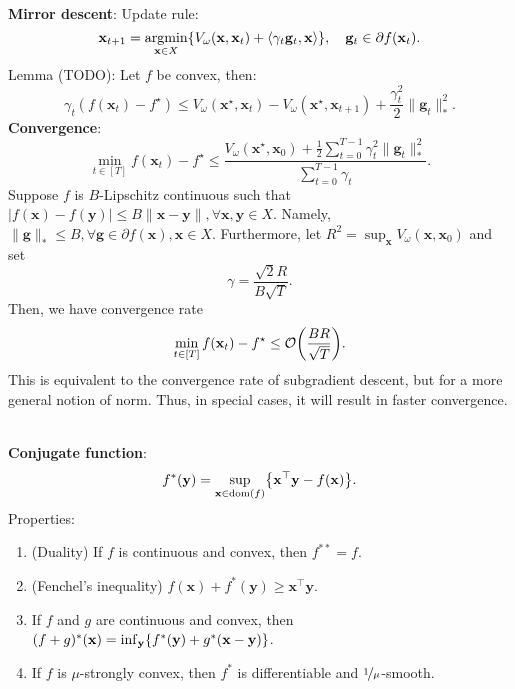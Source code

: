 \documentclass{article}
\DeclareMathOperator*{\argmin}{argmin}
\newcommand{\lft}{\mathopen{}\mathclose\bgroup\left}
\newcommand{\rgt}{\aftergroup\egroup\right}
\renewcommand{\vec}[1]{\mathbf{#1}}
\newcommand{\dom}[1]{\mathrm{dom}(#1)}
\newenvironment{topic}[1]
{\textbf{\sffamily \colorbox{black}{\rlap{\textbf{\textcolor{white}{#1}}}\hspace{\linewidth}\hspace{-2\fboxsep}}} \\ \vspace{0.2cm}}
{}
\begin{document}
\begin{multicols*}{2}
\begin{topic}{Mirror descent}
        \textbf{Mirror descent}: Update rule: \[
            \vec{x}_{t+1} = \argmin_{\vec{x} \in X} \lft\{ V_{\omega}(\vec{x}, \vec{x}_t) + \langle \gamma_t \vec{g}_t, \vec{x} \rangle \rgt\}, \quad \vec{g}_t \in \partial f(\vec{x}_t).
        \]
        Lemma (TODO): Let $f$ be convex, then: \[
            \gamma_t (f(\vec{x}_t) - f^\star) \leq V_{\omega}(\vec{x}^\star, \vec{x}_t) - V_{\omega}(\vec{x}^\star, \vec{x}_{t+1}) + \frac{\gamma_t^2}{2} \| \vec{g}_t \|^2_*.
        \]
        \textbf{Convergence}: \[
            \min_{t \in [T]} f(\vec{x}_t) - f^\star \leq \frac{V_{\omega}(\vec{x}^\star, \vec{x}_0) + \frac{1}{2} \sum_{t=0}^{T-1} \gamma_t^2 \| \vec{g}_t \|_*^2}{\sum_{t=0}^{T-1} \gamma_t}.
        \]
        Suppose $f$ is $B$-Lipschitz continuous such that $|f(\vec{x}) - f(\vec{y})| \leq B \| \vec{x} -
            \vec{y} \|, \forall \vec{x}, \vec{y} \in X$. Namely, $\| \vec{g} \|_* \leq B, \forall \vec{g} \in
            \partial f(\vec{x}), \vec{x} \in X$. Furthermore, let $R^2 = \sup_{\vec{x}} V_{\omega}(\vec{x},
            \vec{x}_0)$ and set \[
            \gamma = \frac{\sqrt{2} R}{B \sqrt{T}}.
        \]
        Then, we have convergence rate \[
            \min_{t \in [T]} f(\vec{x}_t) - f^\star \leq \mathcal{O}\lft( \frac{BR}{\sqrt{T}} \rgt).
        \]
        This is equivalent to the convergence rate of subgradient descent, but for a more general notion of
        norm. Thus, in special cases, it will result in faster convergence.
    \end{topic}

    \begin{topic}{Smoothing}
        \textbf{Conjugate function}: \[
            f^*(\vec{y}) = \sup_{\vec{x} \in \dom{f}} \lft\{ \vec{x}^\top \vec{y} - f(\vec{x}) \rgt\}.
        \]
        Properties:
        \begin{enumerate}
            \item (Duality) If $f$ is continuous and convex, then $f^{**} = f$.
            \item (Fenchel's inequality) $f(\vec{x}) + f^*(\vec{y}) \geq \vec{x}^\top \vec{y}$.
            \item If $f$ and $g$ are continuous and convex, then $(f+g)^*(\vec{x}) = \inf_{\vec{y}} \lft\{
                      f^*(\vec{y}) + g^*(\vec{x} - \vec{y}) \rgt\}$.
            \item If $f$ is $\mu$-strongly convex, then $f^*$ is differentiable and $\nicefrac{1}{\mu}$-smooth.
        \end{enumerate}


\end{topic}
\end{multicols*}
\end{document}
